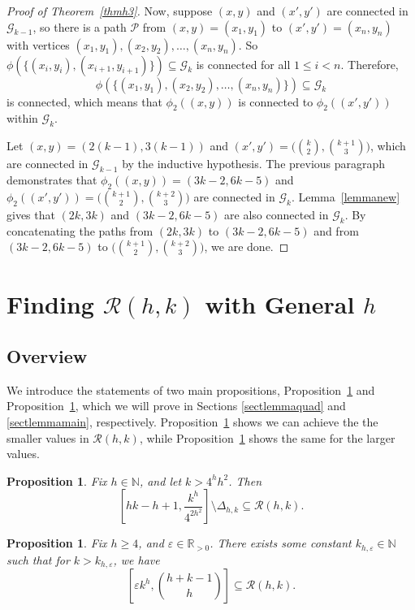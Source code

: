 \documentclass{daj}
\newtheorem{proposition}[theorem]{Proposition}
\theoremstyle{definition}
\theoremstyle{remark}
\numberwithin{equation}{section}
\numberwithin{theorem}{section}
\newcommand{\N}{\mathbb{N}}
\newcommand{\R}{\mathbb{R}}
\newcommand{\calg}{\mathcal{G}}
\newcommand{\calr}{\mathcal{R}}
\begin{document}
\begin{proof}[Proof of Theorem~\ref{thmh3}]
    Now, suppose $(x,y)$ and $(x',y')$ are connected in $\calg_{k-1}$, so there is a path $\mathcal{P}$ from $(x,y)=(x_1,y_1)$ to $(x',y')=(x_n,y_n)$ with vertices $(x_1,y_1),(x_2,y_2),\ldots,(x_n,y_n)$. So $\phi(\{(x_i,y_i),(x_{i+1},y_{i+1})\}) \subseteq \calg_k$ is connected for all $1 \leq i < n$. Therefore, \[\phi(\{(x_1,y_1),(x_2,y_2),\ldots,(x_n,y_n)\})\subseteq \calg_k\] is connected, which means that $\phi_2((x,y))$ is connected to $\phi_2((x',y'))$ within $\calg_k$.

    Let $(x,y) = (2(k-1),3(k-1))$ and $(x',y') = \big(\binom{k}{2},\binom{k+1}{3}\big)$, which are connected in $\calg_{k-1}$ by the inductive hypothesis. The previous paragraph demonstrates that $\phi_2((x,y)) = (3k-2,6k-5)$ and $\phi_2((x',y'))= \big(\binom{k+1}{2},\binom{k+2}{3}\big)$ are connected in $\calg_k$. Lemma~\ref{lemmanew} gives that $(2k,3k)$ and $(3k-2,6k-5)$ are also connected in $\calg_k$. By concatenating the paths from $(2k,3k)$ to $(3k-2,6k-5)$ and from $(3k-2,6k-5)$ to $\big(\binom{k+1}{2},\binom{k+2}{3}\big)$, we are done.
\end{proof}

\section{Finding \texorpdfstring{$\calr(h,k)$}{R(h,k)} with General \texorpdfstring{$h$}{h}}\label{sectgeneralh}

\subsection{Overview}
We introduce the statements of two main propositions, Proposition~\ref{lemmaQuadratic} and Proposition~\ref{lemmaMain}, which we will prove in Sections \ref{sectlemmaquad} and \ref{sectlemmamain}, respectively. Proposition~\ref{lemmaQuadratic} shows we can achieve the the smaller values in $\calr(h,k)$, while Proposition~\ref{lemmaMain} shows the same for the larger values. 

\begin{proposition}\label{lemmaQuadratic}
Fix $h \in \N$, and let $k > 4^hh^2$. Then \[\left[hk-h+1,\frac{k^h}{4^{2h^2}}\right]\setminus \Delta_{h,k} \subseteq \calr(h,k).\]
\end{proposition}

\begin{proposition}\label{lemmaMain}
    Fix $h \geq 4$, and $\varepsilon \in \R_{>0}$. There exists some constant $k_{h,\varepsilon} \in \N$ such that for $k > k_{h,\varepsilon}$, we have \[\left[\varepsilon k^h,\binom{h+k-1}{h}\right] \subseteq \mathcal{R}(h,k).\]
\end{proposition}
\end{document}
